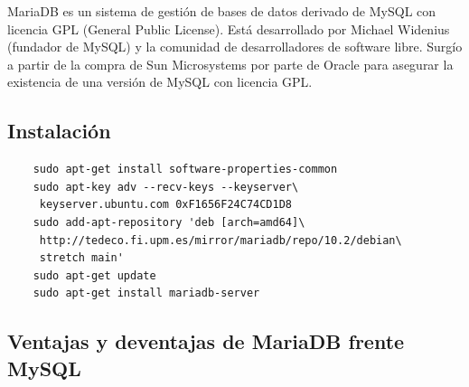 \documentclass[openright,twoside,10pt]{book}
\begin{document}
    MariaDB es un sistema de gestión de bases de datos derivado de MySQL con
    licencia GPL (General Public License). Está desarrollado por Michael
    Widenius (fundador de MySQL) y la comunidad de desarrolladores de
    software libre. Surgío a partir de la compra de Sun Microsystems por
    parte de Oracle para asegurar la existencia de una versión de MySQL con
    licencia GPL.
    
    \subsection{Instalación}\label{instalaciuxf3n-4}
    
    \begin{verbatim}
    sudo apt-get install software-properties-common
    sudo apt-key adv --recv-keys --keyserver\
     keyserver.ubuntu.com 0xF1656F24C74CD1D8
    sudo add-apt-repository 'deb [arch=amd64]\
     http://tedeco.fi.upm.es/mirror/mariadb/repo/10.2/debian\
     stretch main'
    sudo apt-get update
    sudo apt-get install mariadb-server
    \end{verbatim}
    
    \subsection{Ventajas y deventajas de MariaDB frente
    MySQL}\label{ventajas-y-deventajas-de-mariadb-frente-mysql}
    
\end{document}
